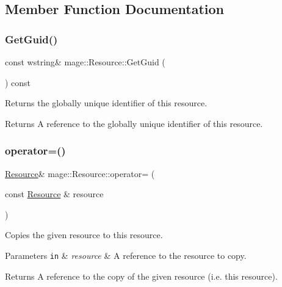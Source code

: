 \subsection{Member Function Documentation}
\hypertarget{classmage_1_1_resource_a4e05079ab19ef95e11cefa487690fd25}{}\label{classmage_1_1_resource_a4e05079ab19ef95e11cefa487690fd25} 
\subsubsection{\texorpdfstring{Get\+Guid()}{GetGuid()}}
{\footnotesize\ttfamily const wstring\& mage\+::\+Resource\+::\+Get\+Guid (\begin{DoxyParamCaption}{ }\end{DoxyParamCaption}) const}

Returns the globally unique identifier of this resource.

\begin{DoxyReturn}{Returns}
A reference to the globally unique identifier of this resource. 
\end{DoxyReturn}
\hypertarget{classmage_1_1_resource_ad8fa57f37eb253b90d18d33383b12875}{}\label{classmage_1_1_resource_ad8fa57f37eb253b90d18d33383b12875} 
\subsubsection{\texorpdfstring{operator=()}{operator=()}\hspace{0.1cm}{\footnotesize\ttfamily [1/2]}}
{\footnotesize\ttfamily \hyperlink{classmage_1_1_resource}{Resource}\& mage\+::\+Resource\+::operator= (\begin{DoxyParamCaption}\item[{const \hyperlink{classmage_1_1_resource}{Resource} \&}]{resource }\end{DoxyParamCaption})\hspace{0.3cm}{\ttfamily [delete]}}

Copies the given resource to this resource.


\begin{DoxyParams}[1]{Parameters}
\mbox{\tt in}  & {\em resource} & A reference to the resource to copy. \\
\hline
\end{DoxyParams}
\begin{DoxyReturn}{Returns}
A reference to the copy of the given resource (i.\+e. this resource). 
\end{DoxyReturn}
\hypertarget{classmage_1_1_resource_a5d087980bb8fb1cd7d96c22d9e0eb519}{}\label{classmage_1_1_resource_a5d087980bb8fb1cd7d96c22d9e0eb519} 
